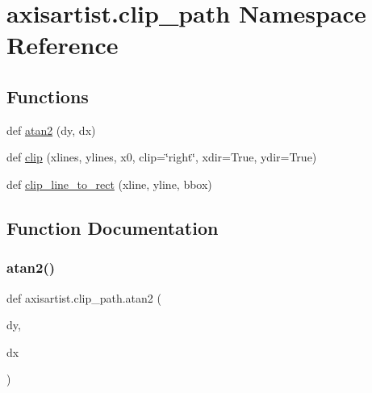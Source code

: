 \hypertarget{namespaceaxisartist_1_1clip__path}{}\section{axisartist.\+clip\+\_\+path Namespace Reference}
\label{namespaceaxisartist_1_1clip__path}
\subsection*{Functions}
\begin{DoxyCompactItemize}
\item 
def \hyperlink{namespaceaxisartist_1_1clip__path_a379ea1caefd5660fd48a9af7b879fded}{atan2} (dy, dx)
\item 
def \hyperlink{namespaceaxisartist_1_1clip__path_adb6ede0dac0a9573fed73ab815b9c92d}{clip} (xlines, ylines, x0, clip=\char`\"{}right\char`\"{}, xdir=True, ydir=True)
\item 
def \hyperlink{namespaceaxisartist_1_1clip__path_a17888f7e35f00336d4682efc180df25b}{clip\+\_\+line\+\_\+to\+\_\+rect} (xline, yline, bbox)
\end{DoxyCompactItemize}


\subsection{Function Documentation}
\mbox{\label{namespaceaxisartist_1_1clip__path_a379ea1caefd5660fd48a9af7b879fded}} 
\subsubsection{\texorpdfstring{atan2()}{atan2()}}
{\footnotesize\ttfamily def axisartist.\+clip\+\_\+path.\+atan2 (\begin{DoxyParamCaption}\item[{}]{dy,  }\item[{}]{dx }\end{DoxyParamCaption})}

\mbox{\label{namespaceaxisartist_1_1clip__path_adb6ede0dac0a9573fed73ab815b9c92d}} 

